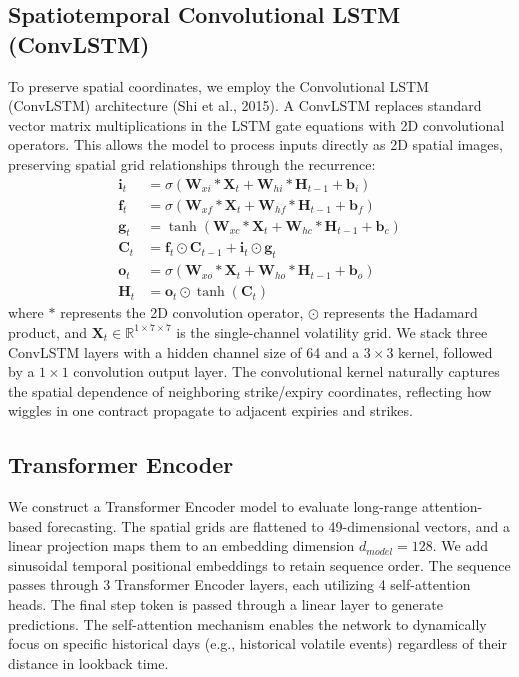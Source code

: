 \documentclass[conference]{IEEEtran}
\begin{document}
\subsection{Spatiotemporal Convolutional LSTM (ConvLSTM)}

To preserve spatial coordinates, we employ the Convolutional LSTM (ConvLSTM) architecture (Shi et al., 2015). A ConvLSTM replaces standard vector matrix multiplications in the LSTM gate equations with 2D convolutional operators. This allows the model to process inputs directly as 2D spatial images, preserving spatial grid relationships through the recurrence:
\begin{align}
\mathbf{i}_t &= \sigma(\mathbf{W}_{xi} * \mathbf{X}_t + \mathbf{W}_{hi} * \mathbf{H}_{t-1} + \mathbf{b}_i) \\
\mathbf{f}_t &= \sigma(\mathbf{W}_{xf} * \mathbf{X}_t + \mathbf{W}_{hf} * \mathbf{H}_{t-1} + \mathbf{b}_f) \\
\mathbf{g}_t &= \tanh(\mathbf{W}_{xc} * \mathbf{X}_t + \mathbf{W}_{hc} * \mathbf{H}_{t-1} + \mathbf{b}_c) \\
\mathbf{C}_t &= \mathbf{f}_t \odot \mathbf{C}_{t-1} + \mathbf{i}_t \odot \mathbf{g}_t \\
\mathbf{o}_t &= \sigma(\mathbf{W}_{xo} * \mathbf{X}_t + \mathbf{W}_{ho} * \mathbf{H}_{t-1} + \mathbf{b}_o) \\
\mathbf{H}_t &= \mathbf{o}_t \odot \tanh(\mathbf{C}_t)
\end{align}
where $*$ represents the 2D convolution operator, $\odot$ represents the Hadamard product, and $\mathbf{X}_t \in \mathbb{R}^{1 \times 7 \times 7}$ is the single-channel volatility grid. We stack three ConvLSTM layers with a hidden channel size of 64 and a $3 \times 3$ kernel, followed by a $1 \times 1$ convolution output layer. The convolutional kernel naturally captures the spatial dependence of neighboring strike/expiry coordinates, reflecting how wiggles in one contract propagate to adjacent expiries and strikes.

\subsection{Transformer Encoder}

We construct a Transformer Encoder model to evaluate long-range attention-based forecasting. The spatial grids are flattened to 49-dimensional vectors, and a linear projection maps them to an embedding dimension $d_{model}=128$. We add sinusoidal temporal positional embeddings to retain sequence order. The sequence passes through 3 Transformer Encoder layers, each utilizing 4 self-attention heads. The final step token is passed through a linear layer to generate predictions. The self-attention mechanism enables the network to dynamically focus on specific historical days (e.g., historical volatile events) regardless of their distance in lookback time.
\end{document}
